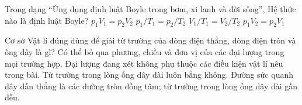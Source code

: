 \begin{ex}
Trong dạng “Ứng dụng định luật Boyle trong bơm, xi lanh và đời sống”, Hệ thức nào là định luật Boyle?
\choice
{\True $p_1V_1=p_2V_2$}
{$p_1/T_1=p_2/T_2$}
{$V_1/T_1=V_2/T_2$}
{$p_1V_2=p_2V_1$}
\end{ex}

\begin{ex}
Cơ sở Vật lí đúng dùng để giải từ trường của dòng điện thẳng, dòng điện tròn và ống dây là gì?
\choice
{Có thể bỏ qua phương, chiều và đơn vị của các đại lượng trong mọi trường hợp.}
{Đại lượng đang xét không phụ thuộc các điều kiện vật lí nêu trong bài.}
{Từ trường trong lòng ống dây dài luôn bằng không.}
{\True Đường sức quanh dây dẫn thẳng là các đường tròn đồng tâm; từ trường trong lòng ống dây dài gần đều.}
\end{ex}
